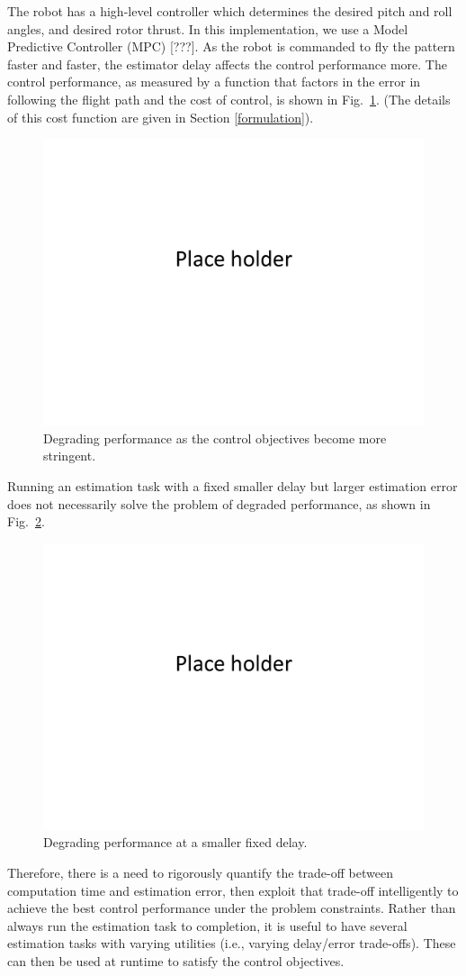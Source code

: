 The robot has a high-level controller which determines the desired pitch and roll angles, and desired rotor thrust. 
In this implementation, we use a Model Predictive Controller (MPC) [???].
As the robot is commanded to fly the pattern faster and faster, the estimator delay affects the control performance more.
The control performance, as measured by a function that factors in the error in following the flight path and the cost of control, is shown in Fig.~\ref{fig:degradingPerformance}.
(The details of this cost function are given in Section \ref{formulation}).
\begin{figure}[t]
	\centering
	\includegraphics[width=0.7\linewidth]{figures/placeHolder}
	\caption{Degrading performance as the control objectives become more stringent.}
	\label{fig:degradingPerformance}
\end{figure}
Running an estimation task with a fixed smaller delay but larger estimation error does not necessarily solve the problem of degraded performance, as shown in Fig.~\ref{fig:degradingPerformanceSmallDelta}.
\begin{figure}[t]
	\centering
	\includegraphics[width=0.7\linewidth]{figures/placeHolder}
	\caption{Degrading performance at a smaller fixed delay.}
	\label{fig:degradingPerformanceSmallDelta}
\end{figure}

Therefore, there is a need to rigorously quantify the trade-off between computation time and estimation error, then exploit that trade-off intelligently to achieve the best control performance under the problem constraints.
Rather than always run the estimation task to completion, it is useful to have several estimation tasks with varying utilities (i.e., varying delay/error trade-offs).
These can then be used at runtime to satisfy the control objectives.

